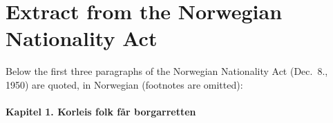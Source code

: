 
\chapter{Extract from the Norwegian Nationality Act}
\label{app_lov}

Below the first three paragraphs of the Norwegian Nationality Act
(Dec.\ 8., 1950) are quoted, in Norwegian (footnotes are omitted):

\begin{center}
\subsubsection*{Kapitel 1. Korleis folk f\aa r borgarretten}
\end{center}

